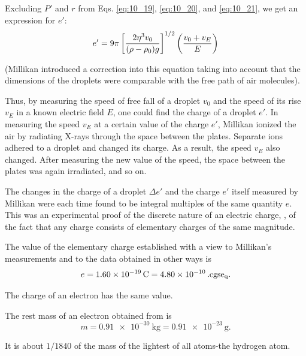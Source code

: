 Excluding $P'$ and $r$ from Eqs. \eqref{eq:10_19}, \eqref{eq:10_20}, and \eqref{eq:10_21}, we get an expression for $e'$:
\begin{equation}\label{eq:10_22}
    e' = 9\pi \left[ \frac{2\eta^3 v_0}{(\rho-\rho_0)g} \right]^{1/2} \left( \frac{v_0+v_E}{E} \right)
\end{equation}

\noindent
(Millikan introduced a correction into this equation taking into account that the dimensions of the droplets were comparable with the free path of air molecules).

Thus, by measuring the speed of free fall of a droplet $v_0$ and the speed of its rise $v_E$ in a known electric field $E$, one could find the charge of a droplet $e'$.
In measuring the speed $v_E$ at a certain value of the charge $e'$, Millikan ionized the air by radiating X-rays through the space between the plates.
Separate ions adhered to a droplet and changed its charge.
As a result, the speed $v_E$ also changed.
After measuring the new value of the speed, the space between the plates was again irradiated, and so on.

The changes in the charge of a droplet $\Delta{e'}$ and the charge $e'$ itself measured by Millikan were each time found to be integral multiples of the same quantity $e$.
This was an experimental proof of the discrete nature of an electric charge, \ie, of the fact that any charge consists of elementary charges of the same magnitude.

The value of the elementary charge established with a view to Millikan's measurements and to the data obtained in other ways is
\begin{equation}\label{eq:10_23}
    e = \SI{1.60e-19}{\coulomb} = \SI{4.80e-10} {\text{~cgse$_{q}$}}.
\end{equation}

\noindent
The charge of an electron has the same value.

The rest mass of an electron obtained from  is
\begin{equation}\label{eq:10_24}
    m = \SI{0.91e-30}{\kilo\gram} = \SI{0.91e-23} {\gram}.
\end{equation}

\noindent
It is about $1/1840$ of the mass of the lightest of all atoms-the hydrogen atom.

